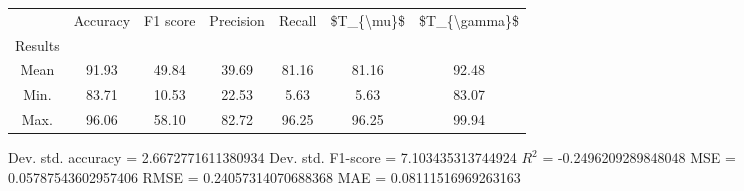\begin{tabular}{|c|c|c|c|c|c|c|}
\toprule
{} &  Accuracy &  F1 score &  Precision &  Recall &  \$T\_\{\textbackslash mu\}\$ &  \$T\_\{\textbackslash gamma\}\$ \\
Results &           &           &            &         &            &               \\
\hline
Mean    &     91.93 &     49.84 &      39.69 &   81.16 &      81.16 &         92.48 \\
Min.    &     83.71 &     10.53 &      22.53 &    5.63 &       5.63 &         83.07 \\
Max.    &     96.06 &     58.10 &      82.72 &   96.25 &      96.25 &         99.94 \\
\bottomrule
\end{tabular}

 Dev. std. accuracy = 2.6672771611380934
 Dev. std. F1-score = 7.103435313744924
 $R^2$ = -0.2496209289848048
 MSE = 0.05787543602957406
 RMSE = 0.24057314070688368
 MAE = 0.08111516969263163